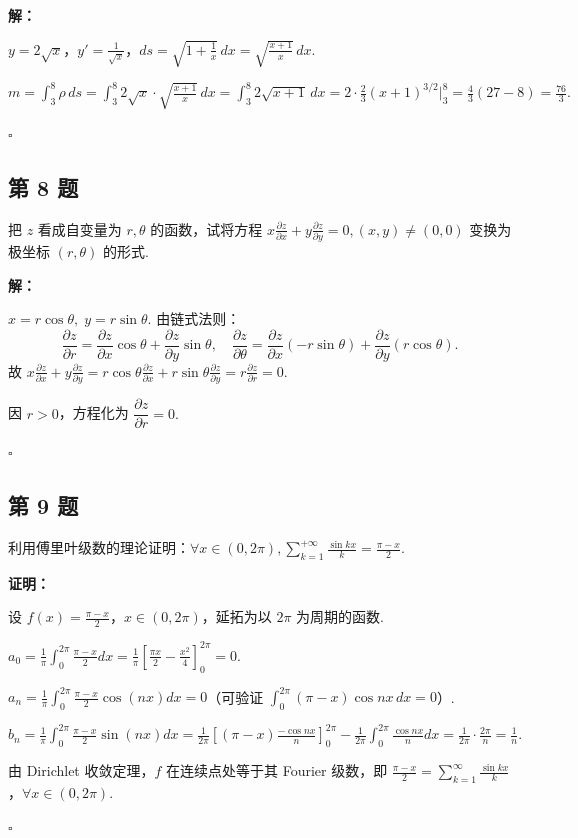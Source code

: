 \documentclass[12pt,a4paper]{article}
\newenvironment{sol}[1][解]{%
  \par\medskip\noindent\textbf{#1：}\itshape\par\noindent\ignorespaces
}{%
  \par\hfill$\square$\par\medskip
}
\begin{document}
\begin{sol}$y=2\sqrt{x}$，$y'=\frac{1}{\sqrt{x}}$，$ds=\sqrt{1+\frac{1}{x}}\,dx=\sqrt{\frac{x+1}{x}}\,dx$.

  $m=\int_3^8\rho\,ds=\int_3^8
  2\sqrt{x}\cdot\sqrt{\frac{x+1}{x}}\,dx=\int_3^8
  2\sqrt{x+1}\,dx=2\cdot\frac{2}{3}(x+1)^{3/2}\Big|_3^8=\frac{4}{3}(27-8)=\frac{76}{3}.$

\end{sol}
\subsection*{第 8 题}
把 $z$ 看成自变量为 $r,\theta$ 的函数，试将方程 $x\frac{\partial z}{\partial
x}+y\frac{\partial z}{\partial y}=0, (x,y)\ne(0,0)$ 变换为极坐标 $(r,\theta)$ 的形式.

\begin{sol}$x=r\cos\theta,\; y=r\sin\theta$. 由链式法则：
  $$\frac{\partial z}{\partial r}=\frac{\partial z}{\partial
  x}\cos\theta+\frac{\partial z}{\partial y}\sin\theta,\quad
  \frac{\partial z}{\partial\theta}=\frac{\partial z}{\partial
  x}(-r\sin\theta)+\frac{\partial z}{\partial y}(r\cos\theta).$$
  故 $x\frac{\partial z}{\partial x}+y\frac{\partial z}{\partial
  y}=r\cos\theta\frac{\partial z}{\partial x}+r\sin\theta\frac{\partial
  z}{\partial y}=r\frac{\partial z}{\partial r}=0$.

  因 $r>0$，方程化为 $\dfrac{\partial z}{\partial r}=0.$

\end{sol}
\subsection*{第 9 题}
利用傅里叶级数的理论证明：$\forall x\in(0,2\pi), \sum_{k=1}^{+\infty}\frac{\sin
kx}{k}=\frac{\pi-x}{2}$.

\begin{sol}[证明]设 $f(x)=\frac{\pi-x}{2}$，$x\in(0,2\pi)$，延拓为以 $2\pi$ 为周期的函数.

  $a_0=\frac{1}{\pi}\int_0^{2\pi}\frac{\pi-x}{2}dx=\frac{1}{\pi}\left[\frac{\pi
  x}{2}-\frac{x^2}{4}\right]_0^{2\pi}=0.$

  $a_n=\frac{1}{\pi}\int_0^{2\pi}\frac{\pi-x}{2}\cos(nx)dx=0$（可验证
  $\int_0^{2\pi}(\pi-x)\cos nx\,dx=0$）.

  $b_n=\frac{1}{\pi}\int_0^{2\pi}\frac{\pi-x}{2}\sin(nx)dx=\frac{1}{2\pi}\left[(\pi-x)\frac{-\cos
  nx}{n}\right]_0^{2\pi}-\frac{1}{2\pi}\int_0^{2\pi}\frac{\cos
  nx}{n}dx=\frac{1}{2\pi}\cdot\frac{2\pi}{n}=\frac{1}{n}.$

  由 Dirichlet 收敛定理，$f$ 在连续点处等于其 Fourier 级数，即
  $\frac{\pi-x}{2}=\sum_{k=1}^{\infty}\frac{\sin kx}{k}$，$\forall
  x\in(0,2\pi)$.
\end{sol}
\end{document}
